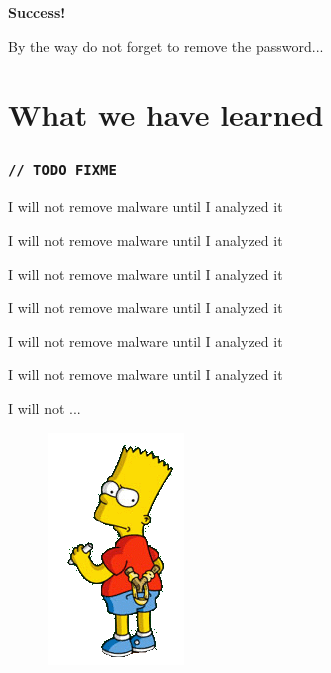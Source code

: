 \documentclass[12pt,a4paper]{beamer}
\newcommand{\mybox}[1]{\par\noindent\colorbox{shadecolor}
{\color{textcolor}\parbox{\dimexpr\textwidth-2\fboxsep\relax}{\fontsize{3em}{3.5em}\selectfont\textbf{{#1}}}}}
\begin{document}
\begin{frame}

    \mybox{Success!}
    By the way do not forget to remove the password...

\end{frame}

\section{What we have learned}


{

\begin{frame}
\frametitle{\texttt{// TODO FIXME}}

\begin{itemize}
{\color{white}
	\item[] I will not remove malware until I analyzed it
	\item[] I will not remove malware until I analyzed it
	\item[] I will not remove malware until I analyzed it
	\item[] I will not remove malware until I analyzed it
	\item[] I will not remove malware until I analyzed it
	\item[] I will not remove malware until I analyzed it
	\item[] I will not ...
}
\end{itemize}

\begin{figure}
\hfill\includegraphics[scale=0.4]{images/bart.png}

\end{figure}

\end{frame}
}
\end{document}
